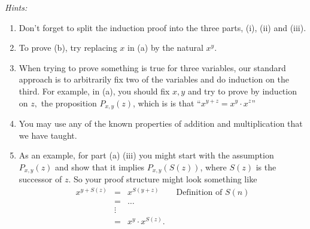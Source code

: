 \documentclass[12pt]{article}
\begin{document}
	\noindent
	\textit{Hints:}
	\begin{enumerate}
		\item Don't forget to split the induction proof into the three parts, (i), (ii)
			and (iii).

		\item To prove (b), try replacing $x$ in (a) by the natural $x^{y}$.

		\item When trying to prove something is true for three variables, our
			standard approach is to arbitrarily fix two of the variables and do
			induction on the third. For example, in (a), you should fix $x,y$ and try to
			prove by induction on $z,$ the proposition $P_{x,y}(z)$, which is is that
			``$x^{y+z}= x^{y} \cdot x^{z}$''

		\item You may use any of the known properties of addition and multiplication
			that we have taught.

		\item As an example, for part (a) (iii) you might start with the assumption
			$P_{x,y}(z)$ and show that it implies $P_{x,y}(S(z))$, where $S(z)$ is the
			successor of $z.$ So your proof structure might look something like
			\begin{eqnarray*}
				x^{y + S(z)} &=& x^{S(y+z)} \qquad \mbox{Definition of $S(n)$}\\
				&=& \ldots\\
				&\vdots&\\
				&=& x^y \cdot x^{S(z)}.
			\end{eqnarray*}
	\end{enumerate}
\end{document}

